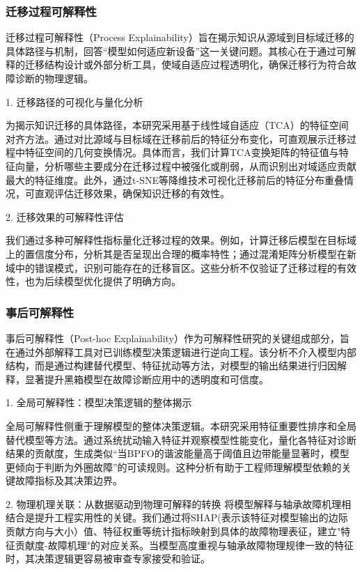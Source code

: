 \documentclass[a4paper]{CPIPC}
\numberwithin{equation}{section}
\begin{document}
\subsubsection{迁移过程可解释性}

迁移过程可解释性（Process Explainability）旨在揭示知识从源域到目标域迁移的具体路径与机制，回答“模型如何适应新设备”这一关键问题。其核心在于通过可解释的迁移结构设计或外部分析工具，使域自适应过程透明化，确保迁移行为符合故障诊断的物理逻辑。

1. 迁移路径的可视化与量化分析

为揭示知识迁移的具体路径，本研究采用基于线性域自适应（TCA）的特征空间对齐方法。通过对比源域与目标域在迁移前后的特征分布变化，可直观展示迁移过程中特征空间的几何变换情况。具体而言，我们计算TCA变换矩阵的特征值与特征向量，分析哪些主要成分在迁移过程中被强化或削弱，从而识别出对域适应贡献最大的特征维度。此外，通过t-SNE等降维技术可视化迁移前后的特征分布重叠情况，可直观评估迁移效果，确保知识迁移的有效性。

2. 迁移效果的可解释性评估

我们通过多种可解释性指标量化迁移过程的效果。例如，计算迁移后模型在目标域上的置信度分布，分析其是否呈现出合理的概率特性；通过混淆矩阵分析模型在新域中的错误模式，识别可能存在的迁移盲区。这些分析不仅验证了迁移过程的有效性，也为后续模型优化提供了明确方向。

\subsubsection{事后可解释性}

事后可解释性（Post-hoc Explainability）作为可解释性研究的关键组成部分，旨在通过外部解释工具对已训练模型决策逻辑进行逆向工程。该分析不介入模型内部结构，而是通过构建替代模型、特征扰动等方法，对模型的输出结果进行归因解释，显著提升黑箱模型在故障诊断应用中的透明度和可信度。

1. 全局可解释性：模型决策逻辑的整体揭示

全局可解释性侧重于理解模型的整体决策逻辑。本研究采用特征重要性排序和全局替代模型等方法。通过系统扰动输入特征并观察模型性能变化，量化各特征对诊断结果的贡献度，生成类似“当BPFO的谐波能量高于阈值且边带能量显著时，模型更倾向于判断为外圈故障”的可读规则。这种分析有助于工程师理解模型依赖的关键故障指标及其决策边界。

2. 物理机理关联：从数据驱动到物理可解释的转换
将模型解释与轴承故障机理相结合是提升工程实用性的关键。我们通过将SHAP(表示该特征对模型输出的边际贡献方向与大小）值、特征权重等统计指标映射到具体的故障物理表征，建立"特征贡献度-故障机理"的对应关系。当模型高度重视与轴承故障物理规律一致的特征时，其决策逻辑更容易被审查专家接受和验证。
\end{document}
